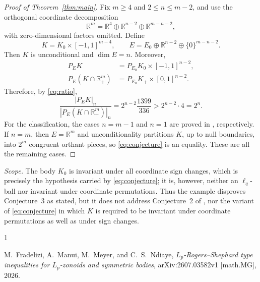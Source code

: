 \documentclass[11pt]{amsart}
\theoremstyle{remark}
\newcommand{\R}{\mathbb{R}}
\begin{document}
\begin{proof}[Proof of Theorem~\ref{thm:main}]
Fix $m\ge4$ and $2\le n\le m-2$, and use the orthogonal coordinate
decomposition
\[
  \R^m=\R^4\oplus\R^{n-2}\oplus\R^{m-n-2},
\]
with zero-dimensional factors omitted. Define
\[
  K=K_0\times[-1,1]^{m-4},
  \qquad
  E=E_0\oplus\R^{n-2}\oplus\{0\}^{m-n-2}.
\]
Then $K$ is unconditional and $\dim E=n$. Moreover,
\begin{align*}
  P_EK&=P_{E_0}K_0\times[-1,1]^{n-2},\\
  P_E(K\cap\R_+^m)&=P_{E_0}K_+\times[0,1]^{n-2}.
\end{align*}
Therefore, by \eqref{eq:ratio},
\[
  \frac{|P_EK|_n}{|P_E(K\cap\R_+^m)|_n}
  =2^{n-2}\frac{1399}{336}
  >2^{n-2}\cdot4
  =2^n.
\]
For the classification, the cases $n=m-1$ and $n=1$ are proved in
\cite[Propositions~3 and~4]{FMMN}, respectively. If $n=m$, then $E=\R^m$ and
unconditionality partitions $K$, up to null boundaries, into $2^m$ congruent
orthant pieces, so \eqref{eq:conjecture} is an equality. These are all the
remaining cases.
\end{proof}

\medskip
\noindent\textit{Scope.}
The body $K_0$ is invariant under all coordinate sign changes, which is
precisely the hypothesis carried by \eqref{eq:conjecture}; it is, however,
neither an $\ell_q$-ball nor invariant under coordinate permutations. Thus the
example disproves Conjecture~3 as stated, but it does not address
Conjecture~2 of \cite{FMMN}, nor the variant of \eqref{eq:conjecture} in which
$K$ is required to be invariant under coordinate permutations as well as under
sign changes.

\begin{thebibliography}{1}

M.~Fradelizi, A.~Manui, M.~Meyer, and C.~S.~Ndiaye,
\emph{$L_p$-Rogers--Shephard type inequalities for $L_p$-zonoids and symmetric
bodies}, arXiv:2607.03582v1 [math.MG], 2026.

\end{thebibliography}
\end{document}
